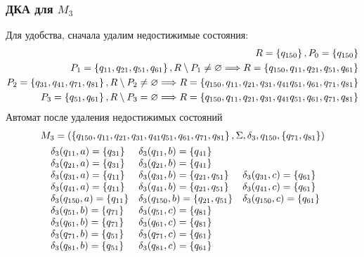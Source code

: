 \newpage
\subsubsection{ДКА для \(M_3\)}
Для удобства, сначала удалим недостижимые состояния:
\begin{align*}
	R = \left\{q_{150}\right\}, P_0 = \left\{q_{150}\right\}                                                                                                                                      \\
	P_1 = \left\{q_{11},q_{21}, q_{51}, q_{61}\right\}, R \setminus P_1 \neq \varnothing \Longrightarrow R = \left\{q_{150}, q_{11},q_{21}, q_{51}, q_{61}\right\}                                \\
	P_2 = \left\{q_{31},q_{41}, q_{71}, q_{81}\right\}, R \setminus P_2 \neq \varnothing \Longrightarrow R = \left\{q_{150}, q_{11},q_{21}, q_{31}, q_{41} q_{51}, q_{61}, q_{71}, q_{81}\right\} \\
	P_3 = \left\{q_{51}, q_{61}\right\}, R \setminus P_3 = \varnothing \Longrightarrow R = \left\{q_{150}, q_{11},q_{21}, q_{31}, q_{41} q_{51}, q_{61}, q_{71}, q_{81}\right\}                   \\
\end{align*}
Автомат после удаления недостижимых состояний
\begin{align*}
	M_3 = \left(\left\{q_{150}, q_{11},q_{21}, q_{31}, q_{41} q_{51}, q_{61}, q_{71}, q_{81}\right\}, \Sigma, \delta_3, q_{150}, \left\{q_{71}, q_{81}\right\}\right) \\
	\begin{array}{lll}
		\delta_{3}(q_{11}, a) =  \left\{q_{31}\right\} & \delta_{3}(q_{11}, b)=  \left\{q_{41}\right\}                                                  \\
		\delta_{3}(q_{21}, a) =  \left\{q_{31}\right\} & \delta_{3}(q_{21}, b)=  \left\{q_{41}\right\}                                                  \\
		\delta_{3}(q_{31}, a) = \left\{q_{11}\right\}  & \delta_{3}(q_{31}, b) = \left\{q_{21}, q_{51}\right\}  & \delta_{3}(q_{31}, c) = \left\{q_{61}\right\}  \\
		\delta_{3}(q_{41}, a) = \left\{q_{11}\right\}  & \delta_{3}(q_{41}, b) = \left\{q_{21}, q_{51}\right\}  & \delta_{3}(q_{41}, c) = \left\{q_{61}\right\}  \\
		\delta_{3}(q_{150}, a) = \left\{q_{11}\right\} & \delta_{3}(q_{150}, b) = \left\{q_{21}, q_{51}\right\} & \delta_{3}(q_{150}, c) = \left\{q_{61}\right\} \\
		\delta_{3}(q_{51}, b)  = \left\{q_{71}\right\} & \delta_{3}(q_{51}, c)  = \left\{q_{81}\right\}                                                 \\
		\delta_{3}(q_{61}, b)  = \left\{q_{71}\right\} & \delta_{3}(q_{61}, c)  = \left\{q_{81}\right\}                                                 \\
		\delta_{3}(q_{71}, b) = \left\{q_{51}\right\}  & \delta_{3}(q_{71}, c) =\left\{q_{61}\right\}                                                   \\
		\delta_{3}(q_{81}, b) = \left\{q_{51}\right\}  & \delta_{3}(q_{81}, c) =\left\{q_{61}\right\}                                                   \\
	\end{array}
\end{align*}

